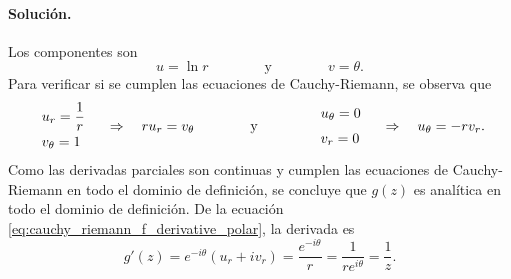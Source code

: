 \documentclass[a4paper]{report}
\begin{document}
\paragraph{Solución.} Los componentes son 
 \[
  u=\ln r
  \qquad\qquad\textrm{y}\qquad\qquad
  v=\theta.
 \]
 Para verificar si se cumplen las ecuaciones de Cauchy-Riemann, se observa que 
 \[
 \begin{array}{l}
  u_r=\dfrac{1}{r}\\[\medskipamount]
  v_\theta=1
 \end{array}
 \quad\Rightarrow\quad ru_r=v_\theta
 \qquad\qquad\textrm{y}\qquad\qquad
 \begin{array}{l}
  u_\theta=0\\[\medskipamount]
  v_r=0
 \end{array}
 \quad\Rightarrow\quad u_\theta=-rv_r.
 \]
 Como las derivadas parciales son continuas y cumplen las ecuaciones de Cauchy-Riemann en todo el dominio de definición, se concluye que \(g(z)\) es analítica en todo el dominio de definición. De la ecuación \ref{eq:cauchy_riemann_f_derivative_polar}, la derivada es
 \[
  g'(z)=e^{-i\theta}(u_r+iv_r)=\frac{e^{-i\theta}}{r}=\frac{1}{re^{i\theta}}=\frac{1}{z}.
 \]
\end{document}
